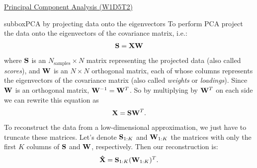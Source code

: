 \begin{textbox}{\href{https://compneuro.neuromatch.io/tutorials/W1D5_DimensionalityReduction/student/W1D5_Tutorial2.html}{Principal Component Analysis (W1D5T2)} }

\begin{subbox}{subbox}{PCA by projecting data onto the eigenvectors
}
\scriptsize
To perform PCA project the data onto the eigenvectors of the covariance matrix, i.e.:
\begin{align}
\bf S = X W
\end{align}
where $\bf S$ is an $N_\text{samples} \times N$ matrix representing the projected data (also called \textit{scores}), and $\bf W$ is an $N\times N$ orthogonal matrix, each of whose columns represents the eigenvectors of the covariance matrix (also called \textit{weights} or \textit{loadings}). 
Since $\bf W$ is an orthogonal matrix, ${\bf W}^{-1} = {\bf W}^T$. So by multiplying by ${\bf W}^T$ on each side we can rewrite this equation as  
\begin{align}
{\bf X = S W}^T.
\end{align}
To reconstruct the data from a low-dimensional approximation, we just have to truncate these matrices.  Let's denote ${\bf S}_{1:K}$ and ${\bf W}_{1:K}$ the matrices with only the first $K$ columns of $\bf S$ and $\bf W$, respectively. Then our reconstruction is:
\begin{align}
{\bf \hat X = S}_{1:K} ({\bf W}_{1:K})^T.
\end{align}
\end{subbox}
\end{textbox}
